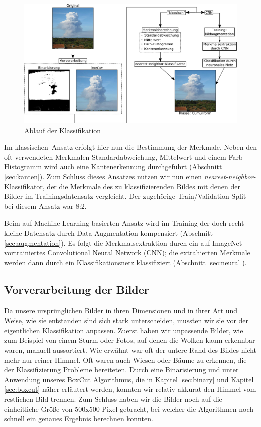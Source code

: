 \documentclass[a4,german]{article}
\begin{document}
\begin{figure}
	\centering
	\includegraphics[height=0.25\paperheight]{Ablauf.pdf}
	\caption{Ablauf der Klassifikation}
	\label{fig:ablauf}
\end{figure}

Im \glqq klassischen\grqq\ Ansatz erfolgt hier nun die Bestimmung der Merkmale.
Neben den oft verwendeten Merkmalen Standardabweichung, Mittelwert und einem Farb-Histogramm wird auch eine Kantenerkennung durchgeführt (Abschnitt \ref{sec:kanten}).
Zum Schluss dieses Ansatzes nutzen wir nun einen \emph{nearest-neighbor}-Klassifikator, der die Merkmale des zu klassifizierenden Bildes mit denen der Bilder im Trainingsdatensatz vergleicht.
Der zugehörige Train/Validation-Split bei diesem Ansatz war 8:2. %

Beim auf Machine Learning basierten Ansatz wird im Training der doch recht kleine Datensatz durch Data Augmentation kompensiert (Abschnitt \ref{sec:augmentation}).
Es folgt die Merkmalsextraktion durch ein auf ImageNet vortrainiertes Convolutional Neural Network (CNN); die extrahierten Merkmale werden dann durch ein Klassifikationsnetz klassifiziert (Abschnitt \ref{sec:neural}).


\subsection{Vorverarbeitung der Bilder}
\label{sec:vorverarbeitung}
Da unsere ursprünglichen Bilder in ihren Dimensionen und in ihrer Art und Weise, wie sie entstanden sind sich stark unterscheiden, mussten wir sie vor der eigentlichen Klassifikation anpassen.
Zuerst haben wir unpassende Bilder, wie zum Beispiel von einem Sturm oder Fotos, auf denen die Wolken kaum erkennbar waren, manuell aussortiert.
Wie erwähnt war oft der untere Rand des Bildes nicht mehr nur reiner Himmel. Oft waren auch Wiesen oder Bäume zu erkennen, die der Klassifizierung Probleme bereiteten.
Durch eine Binarisierung und unter Anwendung unseres BoxCut Algorithmus, die in Kapitel \ref{sec:binary} und Kapitel \ref{sec:boxcut} näher erläutert werden, konnten wir relativ akkurat den Himmel vom restlichen Bild trennen.
Zum Schluss haben wir die Bilder noch auf die einheitliche Größe von 500x500 Pixel gebracht, bei welcher die Algorithmen noch schnell ein genaues Ergebnis berechnen konnten.
\end{document}
